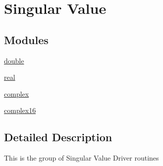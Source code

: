 \hypertarget{group__singGE}{}\section{Singular Value}
\label{group__singGE}
\subsection*{Modules}
\begin{DoxyCompactItemize}
\item 
\hyperlink{group__doubleGEsing}{double}
\item 
\hyperlink{group__realGEsing}{real}
\item 
\hyperlink{group__complexGEsing}{complex}
\item 
\hyperlink{group__complex16GEsing}{complex16}
\end{DoxyCompactItemize}


\subsection{Detailed Description}
This is the group of Singular Value Driver routines 